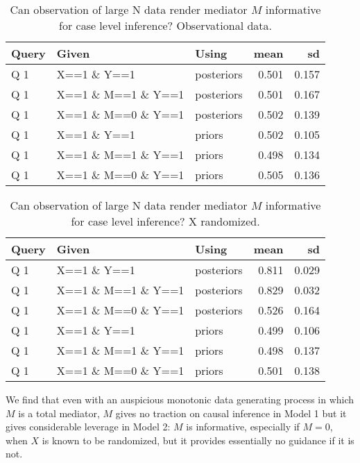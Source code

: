 \documentclass[
  12pt,
]{book}
\begin{document}
\begin{table}

\caption{\label{tab:unnamed-chunk-109}Can observation of large N data render mediator $M$ informative for case level inference? Observational data.}
\centering
\begin{tabular}[t]{l|l|l|r|r}
\hline
Query & Given & Using & mean & sd\\
\hline
Q 1 & X==1 \& Y==1 & posteriors & 0.501 & 0.157\\
\hline
Q 1 & X==1 \& M==1 \& Y==1 & posteriors & 0.501 & 0.167\\
\hline
Q 1 & X==1 \& M==0 \& Y==1 & posteriors & 0.502 & 0.139\\
\hline
Q 1 & X==1 \& Y==1 & priors & 0.502 & 0.105\\
\hline
Q 1 & X==1 \& M==1 \& Y==1 & priors & 0.498 & 0.134\\
\hline
Q 1 & X==1 \& M==0 \& Y==1 & priors & 0.505 & 0.136\\
\hline
\end{tabular}
\end{table}

\begin{table}

\caption{\label{tab:unnamed-chunk-109}Can observation of large N data render mediator $M$ informative for case level inference? X randomized.}
\centering
\begin{tabular}[t]{l|l|l|r|r}
\hline
Query & Given & Using & mean & sd\\
\hline
Q 1 & X==1 \& Y==1 & posteriors & 0.811 & 0.029\\
\hline
Q 1 & X==1 \& M==1 \& Y==1 & posteriors & 0.829 & 0.032\\
\hline
Q 1 & X==1 \& M==0 \& Y==1 & posteriors & 0.526 & 0.164\\
\hline
Q 1 & X==1 \& Y==1 & priors & 0.499 & 0.106\\
\hline
Q 1 & X==1 \& M==1 \& Y==1 & priors & 0.498 & 0.137\\
\hline
Q 1 & X==1 \& M==0 \& Y==1 & priors & 0.501 & 0.138\\
\hline
\end{tabular}
\end{table}

We find that even with an auspicious monotonic data generating process in which \(M\) is a total mediator, \(M\) gives no traction on causal inference in Model 1 but it gives considerable leverage in Model 2: \(M\) is informative, especially if \(M=0\), when \(X\) is known to be randomized, but it provides essentially no guidance if it is not.
\end{document}
